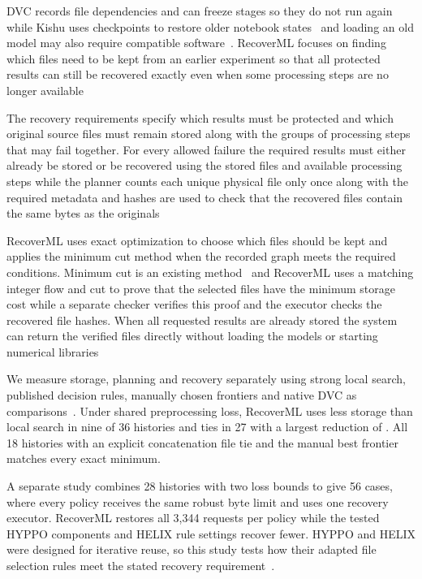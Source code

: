 DVC records file dependencies and can freeze stages so they do not run again~\cite{dvc} while Kishu uses checkpoints to restore older notebook states~\cite{kishu} and loading an old model may also require compatible software~\cite{persistence}. RecoverML focuses on finding which files need to be kept from an earlier experiment so that all protected results can still be recovered exactly even when some processing steps are no longer available

The recovery requirements specify which results must be protected and which original source files must remain stored along with the groups of processing steps that may fail together. For every allowed failure the required results must either already be stored or be recovered using the stored files and available processing steps while the planner counts each unique physical file only once along with the required metadata and hashes are used to check that the recovered files contain the same bytes as the originals

RecoverML uses exact optimization to choose which files should be kept and applies the minimum cut method when the recorded graph meets the required conditions. Minimum cut is an existing method~\cite{flow} and RecoverML uses a matching integer flow and cut to prove that the selected files have the minimum storage cost while a separate checker verifies this proof and the executor checks the recovered file hashes. When all requested results are already stored the system can return the verified files directly without loading the models or starting numerical libraries


We measure storage, planning and recovery separately using strong local search, published decision rules, manually chosen frontiers and native DVC as comparisons~\cite{artifact}. Under shared preprocessing loss, RecoverML uses less storage than local search in nine of 36 histories and ties in 27 with a largest reduction of . All 18 histories with an explicit concatenation file tie and the manual best frontier matches every exact minimum.

A separate study combines 28 histories with two loss bounds to give 56 cases, where every policy receives the same robust byte limit and uses one recovery executor. RecoverML restores all 3,344 requests per policy while the tested HYPPO components and HELIX rule settings recover fewer. HYPPO and HELIX were designed for iterative reuse, so this study tests how their adapted file selection rules meet the stated recovery requirement~\cite{artifact}.

